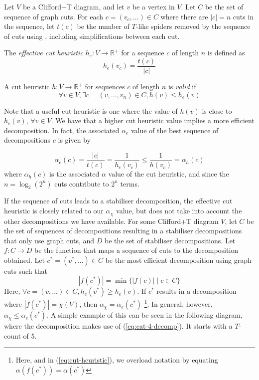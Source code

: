 \begin{definition}
    Let $V$ be a Clifford+T diagram, and let $v$ be a vertex in $V$.
    Let $C$ be the set of sequence of graph cuts.
    For each $c=(v_c,...)\in C$ where there are $|c|=n$ cuts in the sequence,
    let $t(c)$ be the number of $T$-like spiders removed by the sequence of cuts 
    using \CutRule, including simplifications between each cut.

    The \textit{effective cut heuristic} $h_e:V\to \mathbb{R}^+$ 
    for a sequence $c$ of length $n$ is defined as
    \begin{equation}
        h_e(v_c) = \frac{t(c)}{|c|}
    \end{equation}

    A cut heuristic $h:V\to \mathbb{R}^+$ for sequences $c$ of length $n$ is \textit{valid} if
    \begin{equation}
        \forall v\in V, \exists c=(v,...,v_n)\in C, h(v) \leq h_e(v)
    \end{equation}
\end{definition}

Note that a useful cut heuristic is one where the value of $h(v)$ is close to $h_e(v)$, $\forall v\in V$.
We have that a higher cut heuristic value implies a more efficient decomposition.
In fact, the associated $\alpha_e$ value of the best sequence of \CutRule decompositions $c$ is given by 

\begin{equation}
    \label{eq:cut-heuristic}
    \alpha_e(c) = \frac{|c|}{t(c)} = \frac{1}{h_e(v_c)} \leq \frac{1}{h(v_c)} = \alpha_h(c)
\end{equation}
where $\alpha_h(c)$ is the associated $\alpha$ value of the cut heuristic,
and since the $n=\log_2(2^n)$ cuts contribute to $2^n$ terms.

If the sequence of cuts leads to a stabiliser decomposition,
the effective cut heuristic is closely related to our $\alpha_{\chi}$ value,
but does not take into account the other decompositions we have available.
For some Clifford+T diagram $V$,
let $C$ be the set of sequences of decompositions resulting in a stabiliser decompositions 
that only use graph cuts, and $D$ be the set of stabiliser decompositions. 
Let $f: C \to D$ be the function that maps a sequence of cuts to the decomposition obtained.
Let $c^*=(v^*,...)\in C$ be the most efficient decomposition using graph cuts such that
\begin{equation}
    |f(c^*)|=\min \{\left|f(c)\right| \mid c\in C\}
\end{equation}
Here, $\forall c=(v,...)\in C, h_e(v^*) \geq h_e(v)$.
If $c^*$ results in a decomposition where $|f(c^*)|=\chi(V)$,
then $\alpha_{\chi} = \alpha_e(c^*)$
\footnote{Here, and in (\ref{eq:cut-heuristic}), we overload notation 
by equating $\alpha(f(c^*)) = \alpha(c^*)$}.
In general, however, $\alpha_{\chi} \leq \alpha_e(c^*)$.
A simple example of this can be seen in the following diagram,
where the decomposition makes use of  (\ref{eq:cat-4-decomp}).
It starts with a $T$-count of 5.

